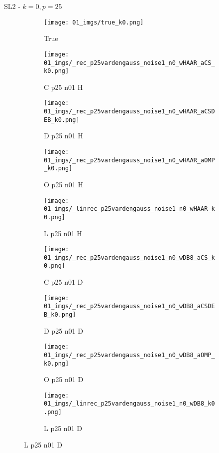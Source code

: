 \begin{frame}{SL2 - $k=0,p=25$}{}
\begin{figure}
\begin{subfigure}{0.1\textwidth}
\texttt{[image: 01\_imgs/true\_k0.png]}
\caption*{\Tiny True}
\end{subfigure}
\begin{subfigure}{0.1\textwidth}
\texttt{[image: 01\_imgs/\_rec\_p25vardengauss\_noise1\_n0\_wHAAR\_aCS\_k0.png]}
\caption*{\Tiny C p25 n01 H}
\end{subfigure}
\begin{subfigure}{0.1\textwidth}
\texttt{[image: 01\_imgs/\_rec\_p25vardengauss\_noise1\_n0\_wHAAR\_aCSDEB\_k0.png]}
\caption*{\Tiny D p25 n01 H}
\end{subfigure}
\begin{subfigure}{0.1\textwidth}
\texttt{[image: 01\_imgs/\_rec\_p25vardengauss\_noise1\_n0\_wHAAR\_aOMP\_k0.png]}
\caption*{\Tiny O p25 n01 H}
\end{subfigure}
\begin{subfigure}{0.1\textwidth}
\texttt{[image: 01\_imgs/\_linrec\_p25vardengauss\_noise1\_n0\_wHAAR\_k0.png]}
\caption*{\Tiny L p25 n01 H}
\end{subfigure}
\begin{subfigure}{0.1\textwidth}
\texttt{[image: 01\_imgs/\_rec\_p25vardengauss\_noise1\_n0\_wDB8\_aCS\_k0.png]}
\caption*{\Tiny C p25 n01 D}
\end{subfigure}
\begin{subfigure}{0.1\textwidth}
\texttt{[image: 01\_imgs/\_rec\_p25vardengauss\_noise1\_n0\_wDB8\_aCSDEB\_k0.png]}
\caption*{\Tiny D p25 n01 D}
\end{subfigure}
\begin{subfigure}{0.1\textwidth}
\texttt{[image: 01\_imgs/\_rec\_p25vardengauss\_noise1\_n0\_wDB8\_aOMP\_k0.png]}
\caption*{\Tiny O p25 n01 D}
\end{subfigure}
\begin{subfigure}{0.1\textwidth}
\texttt{[image: 01\_imgs/\_linrec\_p25vardengauss\_noise1\_n0\_wDB8\_k0.png]}
\caption*{\Tiny L p25 n01 D}
\end{subfigure}


\vspace{5pt}


\end{figure}
\end{frame}
